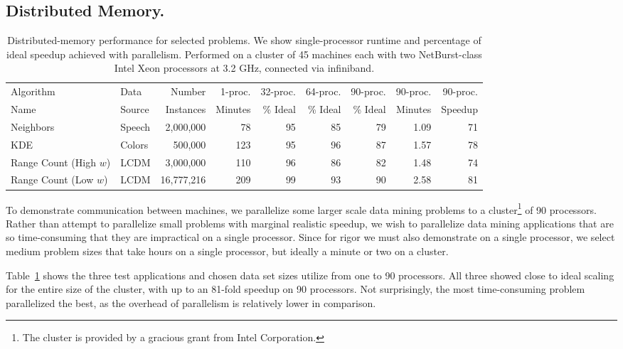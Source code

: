 \documentclass[twoside,leqno,twocolumn]{article}
\newcommand{\tab}[1]{Table~\ref{tab:#1}}
\newcommand{\mysub}[1]{\subsection{#1.}}
\begin{document}
\mysub{Distributed Memory}

\begin{table}
  \centering
  \begin{tabular}{|l|l|r|r||r|r|r||r|r|}
    \hline
    Algorithm               & Data      & Number     & 1-proc. & 32-proc.  & 64-proc.  & 90-proc.  & 90-proc. & 90-proc.
    \\
    Name                    & Source    & Instances  & Minutes & \% Ideal & \% Ideal & \% Ideal & Minutes & Speedup
    \\ \hline \hline
    Neighbors               & Speech    & 2,000,000  & 78  & 95 & 85 & 79 & 1.09 & 71
    \\ \hline
    KDE                     & Colors    & 500,000    & 123 & 95 & 96 & 87 & 1.57 & 78
    \\ \hline
    Range Count (High $w$)  & LCDM      & 3,000,000  & 110 & 96 & 86 & 82 & 1.48 & 74
    \\ \hline
    Range Count (Low $w$)   & LCDM      & 16,777,216 & 209 & 99 & 93 & 90 & 2.58 & 81
    \\ \hline
  \end{tabular}
  \caption{
  \label{tab:distributed}
  Distributed-memory performance for selected problems.
  We show single-processor runtime and percentage of ideal speedup achieved with parallelism.
  Performed on a cluster of 45 machines each with two NetBurst-class Intel Xeon processors at 3.2 GHz, connected via infiniband.
  }
\end{table}

To demonstrate communication between machines, we parallelize some larger scale data mining problems to a cluster\footnote{The cluster is provided by a gracious grant from Intel Corporation.} of 90 processors.
Rather than attempt to parallelize small problems with marginal realistic speedup, we wish to parallelize data mining applications that are so time-consuming that they are impractical on a single processor.
Since for rigor we must also demonstrate on a single processor, we select medium problem sizes that take hours on a single processor, but ideally a minute or two on a cluster.

\tab{distributed} shows the three test applications and chosen data set sizes utilize from one to 90 processors.
All three showed close to ideal scaling for the entire size of the cluster, with up to an 81-fold speedup on 90 processors.
Not surprisingly, the most time-consuming problem parallelized the best, as the overhead of parallelism is relatively lower in comparison.
\end{document}
